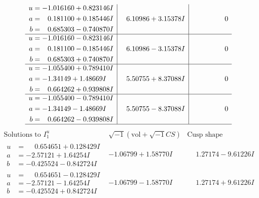 \documentclass[1p]{elsarticle_modified}
\theoremstyle{definition}
\newcommand{\I}{\sqrt{-1}}
\begin{document}
$$\begin{array}{c|c|c}
\begin{aligned}
u &= -1.016160 + 0.823146 I \\
a &= \phantom{-}0.181100 + 0.185446 I \\
b &= \phantom{-}0.685303 - 0.740870 I\end{aligned}
 & \phantom{-}6.10986 + 3.15378 I & \phantom{-0.000000 } 0 \\ \hline\begin{aligned}
u &= -1.016160 - 0.823146 I \\
a &= \phantom{-}0.181100 - 0.185446 I \\
b &= \phantom{-}0.685303 + 0.740870 I\end{aligned}
 & \phantom{-}6.10986 - 3.15378 I & \phantom{-0.000000 } 0 \\ \hline\begin{aligned}
u &= -1.055400 + 0.789410 I \\
a &= -1.34149 + 1.48669 I \\
b &= \phantom{-}0.664262 + 0.939808 I\end{aligned}
 & \phantom{-}5.50755 + 8.37088 I & \phantom{-0.000000 } 0 \\ \hline\begin{aligned}
u &= -1.055400 - 0.789410 I \\
a &= -1.34149 - 1.48669 I \\
b &= \phantom{-}0.664262 - 0.939808 I\end{aligned}
 & \phantom{-}5.50755 - 8.37088 I & \phantom{-0.000000 } 0\\
 \hline 
 \end{array}$$\newpage$$\begin{array}{c|c|c}  
\text{Solutions to }I^u_{1}& \I (\text{vol} + \sqrt{-1}CS) & \text{Cusp shape}\\
 \hline 
\begin{aligned}
u &= \phantom{-}0.654651 + 0.128429 I \\
a &= -2.57121 + 1.64254 I \\
b &= -0.425524 - 0.842724 I\end{aligned}
 & -1.06799 + 1.58770 I & \phantom{-}1.27174 - 9.61226 I \\ \hline\begin{aligned}
u &= \phantom{-}0.654651 - 0.128429 I \\
a &= -2.57121 - 1.64254 I \\
b &= -0.425524 + 0.842724 I\end{aligned}
 & -1.06799 - 1.58770 I & \phantom{-}1.27174 + 9.61226 I \\ \hline\begin{aligned}

\end{aligned}
\end{array}$$
\end{document}
